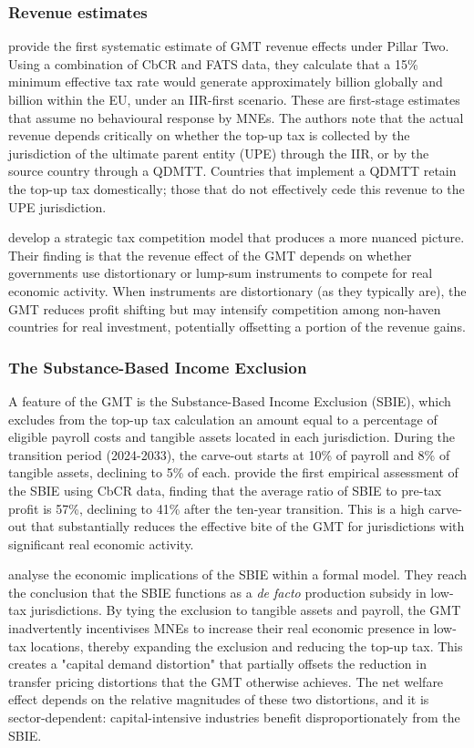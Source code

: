 \documentclass[11pt,a4paper]{article}
\newcommand{\EUR}{\texteuro}
\begin{document}
\subsubsection{Revenue estimates}

\citet{barake2022} provide the first systematic estimate of GMT revenue effects under Pillar Two. Using a combination of CbCR and FATS data, they calculate that a 15\% minimum effective tax rate would generate approximately \EUR 179 billion globally and \EUR 55 billion within the EU, under an IIR-first scenario. These are first-stage estimates that assume no behavioural response by MNEs. The authors note that the actual revenue depends critically on whether the top-up tax is collected by the jurisdiction of the ultimate parent entity (UPE) through the IIR, or by the source country through a QDMTT. Countries that implement a QDMTT retain the top-up tax domestically; those that do not effectively cede this revenue to the UPE jurisdiction.

\citet{janeba2023} develop a strategic tax competition model that produces a more nuanced picture. Their  finding is that the revenue effect of the GMT depends on whether governments use distortionary or lump-sum instruments to compete for real economic activity. When instruments are distortionary (as they typically are), the GMT reduces profit shifting but may intensify competition among non-haven countries for real investment, potentially offsetting a portion of the revenue gains. 

\subsubsection{The Substance-Based Income Exclusion}

A feature of the GMT is the Substance-Based Income Exclusion (SBIE), which excludes from the top-up tax calculation an amount equal to a percentage of eligible payroll costs and tangible assets located in each jurisdiction. During the transition period (2024-2033), the carve-out starts at 10\% of payroll and 8\% of tangible assets, declining to 5\% of each. \citet{devereux2023} provide the first empirical assessment of the SBIE using CbCR data, finding that the average ratio of SBIE to pre-tax profit is 57\%, declining to 41\% after the ten-year transition. This is a high carve-out that substantially reduces the effective bite of the GMT for jurisdictions with significant real economic activity.

\citet{schjelderup2024} analyse the economic implications of the SBIE within a formal model. They reach the conclusion that the SBIE functions as a \emph{de facto} production subsidy in low-tax jurisdictions. By tying the exclusion to tangible assets and payroll, the GMT inadvertently incentivises MNEs to increase their real economic presence in low-tax locations, thereby expanding the exclusion and reducing the top-up tax. This creates a "capital demand distortion" that partially offsets the reduction in transfer pricing distortions that the GMT otherwise achieves. The net welfare effect depends on the relative magnitudes of these two distortions, and it is sector-dependent: capital-intensive industries benefit disproportionately from the SBIE.
\end{document}
